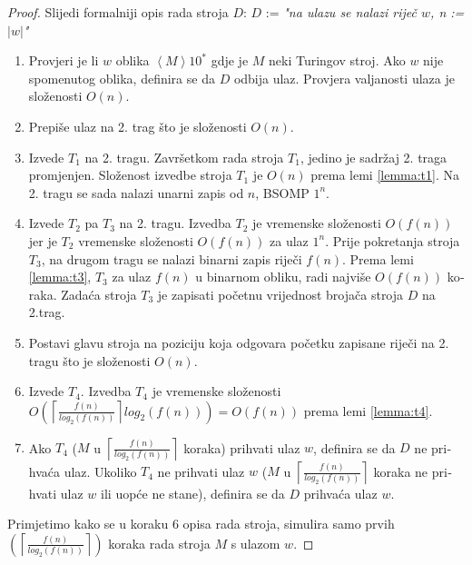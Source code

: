 \documentclass[12pt]{rectors}
\begin{document}
\begin{otherlanguage}{croatian}
\begin{proof}
Slijedi formalniji opis rada stroja $D$:\newline
$D$ := \textit{"na ulazu se nalazi riječ $w$, n := $ \left |w \right |$"} 
\begin{enumerate}
    \item Provjeri je li $w$ oblika $\left < M \right >10^*$ gdje je $M$ neki Turingov stroj. Ako $w$ nije spomenutog oblika,
        definira se da $D$ odbija ulaz. Provjera valjanosti ulaza je složenosti $O(n)$.
    \item Prepiše ulaz na 2. trag što je složenosti $O(n)$.
           
    \item Izvede $T_1$ na 2. tragu.\newline
    Završetkom rada stroja $T_1$, jedino je sadržaj 2. traga promjenjen. Složenost izvedbe stroja $T_1$ je $O(n)$ prema lemi \ref{lemma:t1}.
    Na 2. tragu se sada nalazi unarni zapis od $n$, BSOMP $1^n$.
    
    \item Izvede $T_2$ 
    pa $T_3$ na 2. tragu\label{korak13}.\newline
     Izvedba $T_2$ je vremenske složenosti $O(f(n))$ jer je $T_2$ vremenske 
    složenosti $O(f(n))$ za ulaz $1^n$. 
    Prije pokretanja stroja $T_3$, na drugom tragu se nalazi binarni zapis riječi $f \left (n \right )$. 
    Prema lemi \ref{lemma:t3}, $T_3$ za ulaz $f(n)$ u binarnom obliku, radi najviše $O(f(n))$ koraka.
    Zadaća stroja $T_3$ je zapisati početnu vrijednost brojača stroja $D$ na 2.trag. 
    
    \item Postavi glavu stroja na poziciju koja odgovara početku zapisane riječi na 2. tragu što je složenosti $O(n)$.
    \item Izvede $T_4$.\newline
     Izvedba $T_4$ je vremenske složenosti $O \left ( \left \lceil{\frac{ f(n)}{log_2(f(n))} }\right \rceil  log_2(f(n)) \right ) = O \left (f(n) \right )$ prema lemi \ref{lemma:t4}.
    
    \item Ako $T_4$ ($M$ u $ \left \lceil{\frac{ f(n)}{log_2(f(n))} }\right \rceil $ koraka) prihvati ulaz $w$, definira se da $D$ ne prihvaća ulaz. Ukoliko $T_4$ ne prihvati ulaz $w$ ($M$ u $ \left \lceil{\frac{ f(n)}{log_2(f(n))} }\right \rceil $ koraka ne prihvati ulaz $w$ ili uopće ne stane), definira se da $D$ prihvaća ulaz $w$.
\end{enumerate}

Primjetimo kako se u koraku  6 opisa rada stroja, simulira samo prvih $ \left ( \left \lceil{\frac{ f(n)}{log_2(f(n))} }\right \rceil \right )$ koraka 
rada stroja $M$ s ulazom $w$. 


\end{proof}
\end{otherlanguage}
\end{document}
